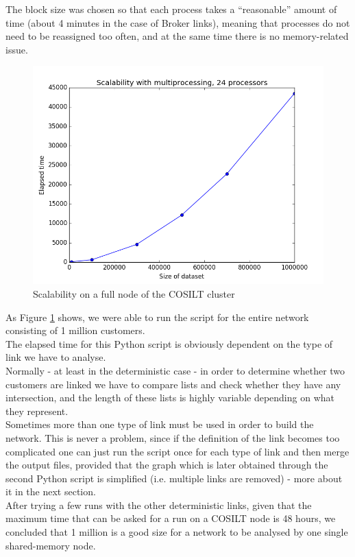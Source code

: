 \documentclass[a4paper,11pt]{book}
\begin{document}
The block size was chosen so that each process takes a ``reasonable'' amount of time (about 4 minutes in the case of Broker links), meaning that processes do not need to be reassigned too often, and at the same time there is no memory-related issue.

\begin{figure}[H]
\centering
\includegraphics[height=7.0 cm,width=10 cm]{24cores_shared.png}
\caption{Scalability on a full node of the COSILT cluster}\label{fig:shared}
\end{figure}
As Figure \ref{fig:shared} shows, we were able to run the script for the entire network consisting of 1 million customers.\\

The elapsed time for this Python script is obviously dependent on the type of link we have to analyse.\\
Normally - at least in the deterministic case - in order to determine whether two customers are linked we have to compare lists and check whether they have any intersection, and the length of these lists is highly variable depending on what they represent.\\

Sometimes more than one type of link must be used in order to build the network. This is never a problem, since if the definition of the link becomes too complicated one can just run the script once for each type of link and then merge the output files, provided that the graph which is later obtained through the second Python script is simplified (i.e. multiple links are removed) - more about it in the next section.\\

After trying a few runs with the other deterministic links, given that the maximum time that can be asked for a run on a COSILT node is 48 hours, we concluded that 1 million is a good size for a network to be analysed by one single shared-memory node.
\end{document}

